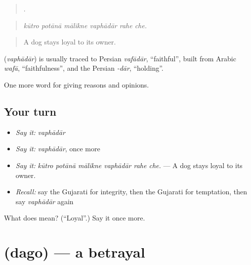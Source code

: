 \begin{quote}
     .
\end{quote}

\begin{quote}
\emph{kūtro potānā mālikne vaphādār rahe che.}
\end{quote}

\begin{quote}
A dog stays loyal to its owner.
\end{quote}

\begin{cousinweb}
\textbf{} (\emph{vaphādār}) is usually traced to Persian \emph{vafādār}, \textquotedblleft{}faithful\textquotedblright{}, built from Arabic \emph{wafā}, \textquotedblleft{}faithfulness\textquotedblright{}, and the Persian \emph{-dār}, \textquotedblleft{}holding\textquotedblright{}.
\end{cousinweb}

\begin{grammarlens}[title={What you've built}]
One more word for giving reasons and opinions.
\end{grammarlens}

\subsection*{Your turn}
\begin{itemize}
\raggedright
  \item \emph{Say it:} \emph{vaphādār}
  \item \emph{Say it:} \emph{vaphādār}, once more
  \item \emph{Say it:} \emph{kūtro potānā mālikne vaphādār rahe che.} — A dog stays loyal to its owner.
  \item \emph{Recall:} say the Gujarati for integrity, then the Gujarati for temptation, then say \emph{vaphādār} again
\end{itemize}

\begin{tcolorbox}[breakable,colback=teal!4,colframe=teal!35!black,title={Before you move on}]
What does  mean? (\textquotedblleft{}Loyal\textquotedblright{}.) Say it once more.
\end{tcolorbox}
\section[\texorpdfstring{\gu{દગો} (dago)}{દગો (dago)}]{ (dago) — a betrayal}

